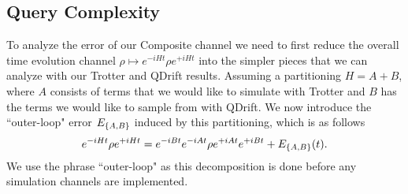 \subsection{Query Complexity}
To analyze the error of our Composite channel we need to first reduce the overall time evolution channel $\rho \mapsto e^{-iHt} \rho e^{+iHt}$ into the simpler pieces that we can analyze with our Trotter and QDrift results. Assuming a partitioning $H = A + B$, where $A$ consists of terms that we would like to simulate with Trotter and $B$ has the terms we would like to sample from with QDrift. We now introduce the ``outer-loop" error $E_{\left\{ A,B \right\}}$ induced by this partitioning, which is as follows
\begin{equation}
    e^{-iHt} \rho e^{+iHt} = e^{-iBt}e^{-iAt} \rho e^{+iAt} e^{+iBt} + E_{\left\{ A,B \right\}}(t).
\end{equation}
We use the phrase ``outer-loop" as this decomposition is done before any simulation channels are implemented. 

